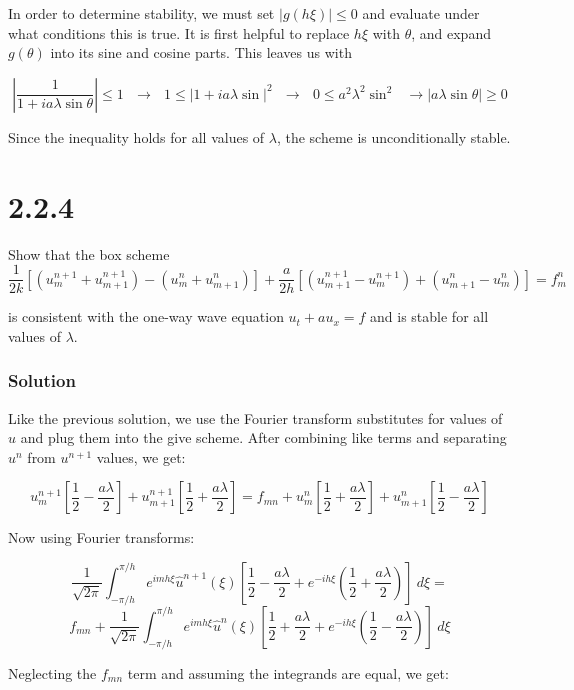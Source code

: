 \documentclass[12pt]{article}
\begin{document}
In order to determine stability, we must set $|g(h\xi)|\leq 0$ and evaluate under what conditions this is true. It is first helpful to replace $h\xi$ with $\theta$, and expand $g(\theta)$ into its sine and cosine parts. This leaves us with

$$ \left|\frac{1}{1+ia\lambda\sin\theta}\right|\leq1 ~~~\longrightarrow ~~~ 1\leq |1+ia\lambda\sin|^2 ~~~ \longrightarrow ~~~ 0\leq a^2\lambda^2\sin^2 ~~~ \longrightarrow |a\lambda\sin\theta| \geq 0 $$

\noindent Since the inequality holds for all values of $\lambda$, the scheme is unconditionally stable.


\section*{2.2.4}
Show that the box scheme
$$\frac{1}{2 k}\left[\left(u_{m}^{n+1}+u_{m+1}^{n+1}\right)-\left(u_{m}^{n}+u_{m+1}^{n}\right)\right]+\frac{a}{2 h}\left[\left(u_{m+1}^{n+1}-u_{m}^{n+1}\right)+\left(u_{m+1}^{n}-u_{m}^{n}\right)\right]=f_{m}^{n}$$

\noindent is consistent with the one-way wave equation $u_{t}+a u_{x}=f$ and is stable for all values of $\lambda$.

\subsubsection*{Solution}

Like the previous solution, we use the Fourier transform substitutes for values of $u$ and plug them into the give scheme. After combining like terms and separating $u^n$ from $u^{n+1}$ values, we get:

$$ 
u_{m}^{n+1}\left[\frac{1}{2} - \frac{a\lambda}{2}\right] + 
u_{m+1}^{n+1}\left[\frac{1}{2} + \frac{a\lambda}{2}\right] = f_{mn} + 
u_{m}^{n}\left[\frac{1}{2} + \frac{a\lambda}{2}\right] + 
u_{m+1}^{n}\left[\frac{1}{2} - \frac{a\lambda}{2}\right] $$

\noindent Now using Fourier transforms:

$$ \frac{1}{\sqrt{2\pi}}\int_{-\pi/h}^{\pi/h}e^{imh\xi}\hat{u}^{n+1}(\xi)\left[\frac{1}{2} - \frac{a\lambda}{2}+e^{-ih\xi}\left(\frac{1}{2} + \frac{a\lambda}{2}\right)\right]~d\xi = $$
$$ f_{mn} + \frac{1}{\sqrt{2\pi}}\int_{-\pi/h}^{\pi/h}e^{imh\xi}\hat{u}^{n}(\xi)\left[\frac{1}{2} + \frac{a\lambda}{2}+e^{-ih\xi}\left(\frac{1}{2} - \frac{a\lambda}{2}\right)\right]~d\xi $$

\noindent Neglecting the $f_{mn}$ term and assuming the integrands are equal, we get:
\end{document}
